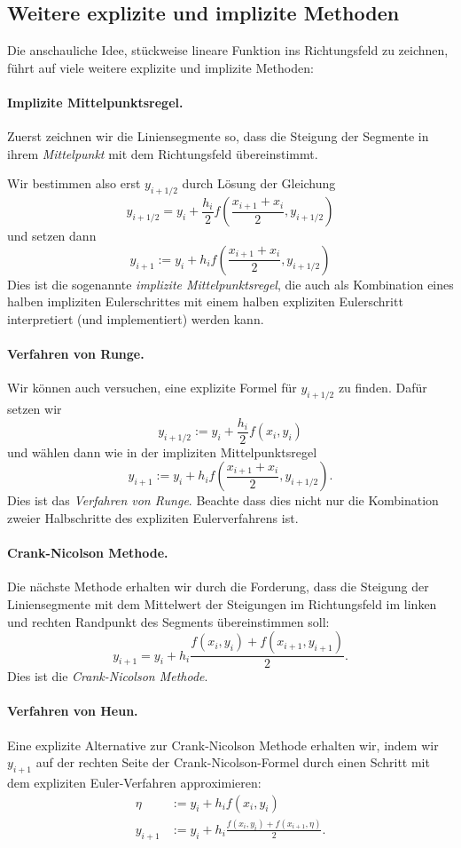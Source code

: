 \documentclass[
]{mycourse}
\theoremstyle{mythm}
\theoremstyle{break}
\begin{document}
\subsection{Weitere explizite und implizite Methoden}\label{subsect:More_ex_and_im_methods}

Die anschauliche Idee, stückweise lineare Funktion ins Richtungsfeld zu zeichnen, führt auf 
viele weitere explizite und implizite Methoden:

\paragraph{Implizite Mittelpunktsregel.}

Zuerst zeichnen wir die Liniensegmente so, dass die Steigung der Segmente in ihrem \emph{Mittelpunkt}
mit dem Richtungsfeld übereinstimmt.

Wir bestimmen also erst $y_{i+1/2}$ durch Lösung der Gleichung
\[
y_{i+1/2}  =y_i+\frac{h_i}{2} f\left( \frac{x_{i+1}+x_i}{2},y_{i+1/2} \right)
\]
und setzen dann
\[
y_{i+1}:=y_i+ h_i  f\left( \frac{x_{i+1}+x_i}{2},y_{i+1/2} \right)
\]
Dies ist die sogenannte \emph{implizite Mittelpunktsregel}, die auch als Kombination eines
halben impliziten Eulerschrittes mit einem halben expliziten Eulerschritt interpretiert (und implementiert) 
werden kann.

\paragraph{Verfahren von Runge.}
Wir können auch versuchen, eine explizite Formel für $y_{i+1/2}$ zu finden. Dafür setzen wir
\[
y_{i+1/2}  :=y_i+\frac{h_i}{2} f(x_i,y_i)
\]
und wählen dann wie in der impliziten Mittelpunktsregel
\[
y_{i+1}:=y_i+ h_i  f\left( \frac{x_{i+1}+x_i}{2},y_{i+1/2} \right).
\]
Dies ist das \emph{Verfahren von Runge}. Beachte dass dies nicht nur die Kombination 
zweier Halbschritte des expliziten Eulerverfahrens ist.

\paragraph{Crank-Nicolson Methode.}
Die nächste Methode erhalten wir durch die Forderung, dass die Steigung der Liniensegmente mit dem Mittelwert
der Steigungen im Richtungsfeld im linken und rechten Randpunkt des Segments übereinstimmen soll:
\[
y_{i+1} = y_i+h_i \frac{f(x_{i},y_{i})+f(x_{i+1},y_{i+1})}{2}.
\]
Dies ist die \emph{Crank-Nicolson Methode}.

\paragraph{Verfahren von Heun.}
Eine explizite Alternative zur Crank-Nicolson Methode erhalten wir, indem wir $y_{i+1}$ auf der rechten Seite 
der Crank-Nicolson-Formel durch einen Schritt mit dem expliziten Euler-Verfahren approximieren:
\begin{align*}
\eta & :=y_i+h_i f(x_i,y_i)\\
y_{i+1} &:= y_i+h_i \frac{f(x_{i},y_{i})+f(x_{i+1},\eta)}{2}.
\end{align*}
\end{document}
